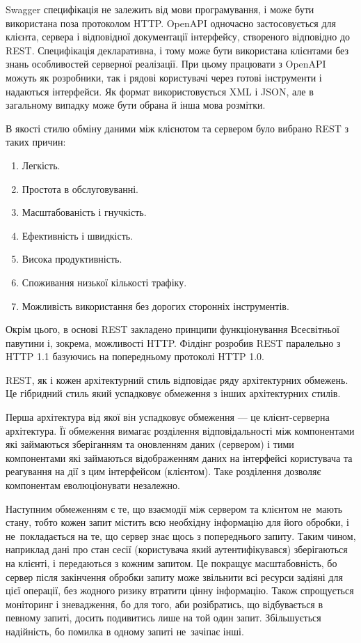 \documentclass[../main.tex]{subfiles}
\begin{document}
Swagger специфікація не залежить від мови програмування, і може бути використана поза протоколом HTTP. OpenAPI одночасно застосовується для клієнта, сервера і відповідної документації інтерфейсу, створеного відповідно до REST. Специфікація декларативна, і тому може бути використана клієнтами без знань особливостей серверної реалізації. При цьому працювати з OpenAPI можуть як розробники, так і рядові користувачі через готові інструменти %
і надаються інтерфейси. Як формат використовується XML і JSON, але в загальному випадку може бути обрана й інша мова розмітки.

В якості стилю обміну даними між клієнотом та сервером було вибрано REST з таких причин:
\begin{enumerate}
	\item Легкість.
	\item Простота в обслуговуванні.
	\item Масштабованість і гнучкість.
	\item Ефективність і швидкість.
	\item Висока продуктивність.
	\item Споживання низької кількості трафіку.
	\item Можливість використання без дорогих сторонніх інструментів.
\end{enumerate}
Окрім цього, в основі REST закладено принципи функціонування Всесвітньої павутини і, зокрема, можливості HTTP. Філдінг розробив REST паралельно з HTTP 1.1 базуючись на попередньому протоколі HTTP 1.0.

REST, як і кожен архітектурний стиль відповідає ряду архітектурних обмежень. Це гібридний стиль який успадковує обмеження з інших архітектурних стилів.

Перша архітектура від якої він успадковує обмеження — це клієнт-серверна архітектура. Її обмеження вимагає розділення відповідальності між компонентами які займаються зберіганням та оновленням даних (сервером) і тими компонентами які займаються відображенням даних на інтерфейсі користувача та реагування на дії з цим інтерфейсом (клієнтом). Таке розділення дозволяє компонентам еволюціонувати незалежно.

Наступним обмеженням є те, що взаємодії між сервером та клієнтом не~мають стану, тобто кожен запит містить всю необхідну інформацію для його обробки, і не~покладається на те, що сервер знає щось з попереднього запиту. Таким чином, наприклад дані про стан сесії (користувача який аутентифікувався) зберігаються на клієнті, і передаються з кожним запитом. Це покращує масштабовність, бо сервер після закінчення обробки запиту може звільнити всі ресурси задіяні для цієї операції, без жодного ризику втратити цінну інформацію. Також спрощується моніторинг і зневадження, бо для того, аби розібратись, що відбувається в певному запиті, досить подивитись лише на той один запит. Збільшується надійність, бо помилка в одному запиті не~зачіпає інші.
\end{document}
